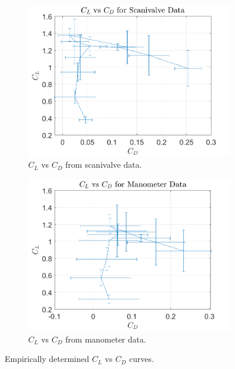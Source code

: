 \documentclass[runningheads]{llncs}
\begin{document}
\begin{figure}[h]
    \centering
    \begin{subfigure}[b]{0.45\textwidth}
         \centering
         \includegraphics[width=\textwidth]{figures/scanivalve_cl__vs_cd_tot.png}
         \caption{$C_L$ vs $C_D$ from scanivalve data.}
         \label{fig:scani_cL_cD}
     \end{subfigure}
     \begin{subfigure}[b]{0.45\textwidth}
         \centering
         \includegraphics[width=\textwidth]{figures/manometer_cl__vs_cd_tot.png}
         \caption{$C_L$ vs $C_D$ from manometer data.}
         \label{fig:mano_cL_cD}
     \end{subfigure}
    \caption{Empirically determined $C_L$ vs $C_D$ curves.}
    \label{fig:cL_vs_cD}
\end{figure}
\end{document}
